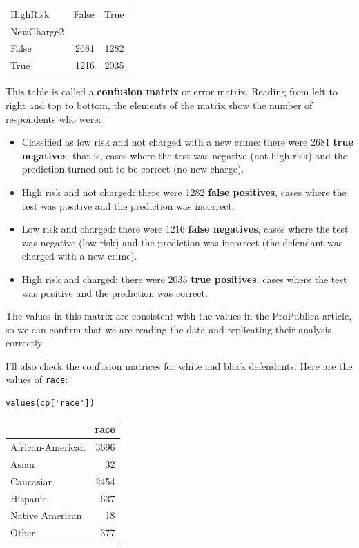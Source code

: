 \begin{tabular}{lrr}
\midrule
HighRisk &  False &  True  \\
NewCharge2 &        &        \\
\midrule
False      &   2681 &   1282 \\
True       &   1216 &   2035 \\
\midrule
\end{tabular}

This table is called a \textbf{confusion matrix} or error matrix.
Reading from left to right and top to bottom, the elements of the matrix
show the number of respondents who were:

\begin{itemize}
\item
  Classified as low risk and not charged with a new crime: there were
  2681 \textbf{true negatives}; that is, cases where the test was
  negative (not high risk) and the prediction turned out to be correct
  (no new charge).
\item
  High risk and not charged: there were 1282 \textbf{false positives},
  cases where the test was positive and the prediction was incorrect.
\item
  Low risk and charged: there were 1216 \textbf{false negatives}, cases
  where the test was negative (low risk) and the prediction was
  incorrect (the defendant was charged with a new crime).
\item
  High risk and charged: there were 2035 \textbf{true positives}, cases
  where the test was positive and the prediction was correct.
\end{itemize}

The values in this matrix are consistent with the values in the
ProPublica article, so we can confirm that we are reading the data and
replicating their analysis correctly.

I'll also check the confusion matrices for white and black defendants.
Here are the values of \passthrough{\lstinline!race!}:

\begin{lstlisting}[]
values(cp['race'])
\end{lstlisting}

\begin{tabular}{lr}
\midrule
{} &  race \\
\midrule
African-American &  3696 \\
Asian            &    32 \\
Caucasian        &  2454 \\
Hispanic         &   637 \\
Native American  &    18 \\
Other            &   377 \\
\midrule
\end{tabular}

